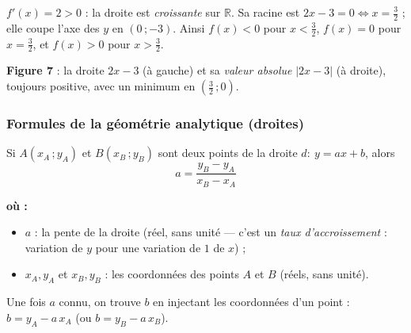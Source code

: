 \documentclass[11pt,a4paper]{article}
\newenvironment{ou}{%
  \par\smallskip\noindent\textbf{où :}\nopagebreak
  \begin{itemize}[leftmargin=1.8em,topsep=2pt,itemsep=1.5pt,parsep=0pt]}%
  {\end{itemize}}
\newcommand{\R}{\mathbb{R}}
\begin{document}
\begin{exemple}[La droite $f(x)=2x-3$]
$f'(x)=2>0$ : la droite est \emph{croissante} sur $\R$. Sa racine est
$2x-3=0\Leftrightarrow x=\frac32$ ; elle coupe l'axe des $y$ en $(0\,;-3)$.
Ainsi $f(x)<0$ pour $x<\frac32$, $f(x)=0$ pour $x=\frac32$, et $f(x)>0$ pour $x>\frac32$.
\end{exemple}

\begin{center}
\hfill
{}
\textbf{\textcolor{primary}{Figure 7}} : la droite $2x-3$ (à gauche) et sa
\emph{valeur absolue} $\lvert 2x-3\rvert$ (à droite), toujours positive, avec un minimum
en $\left(\frac32\,;0\right)$.
\end{center}

\subsubsection{Formules de la géométrie analytique (droites)}

\begin{formule}
Si $A(x_A\,;y_A)$ et $B(x_B\,;y_B)$ sont deux points de la droite $d:\ y=ax+b$, alors
\[
  \boxed{\;a=\dfrac{y_B-y_A}{x_B-x_A}\;}
\]
\begin{ou}
  \item $a$ : la pente de la droite (réel, sans unité — c'est un \emph{taux d'accroissement} : variation de $y$ pour une variation de $1$ de $x$) ;
  \item $x_A,y_A$ et $x_B,y_B$ : les coordonnées des points $A$ et $B$ (réels, sans unité).
\end{ou}
Une fois $a$ connu, on trouve $b$ en injectant les coordonnées d'un point :
$b=y_A-a\,x_A$ (ou $b=y_B-a\,x_B$).
\end{formule}
\end{document}
